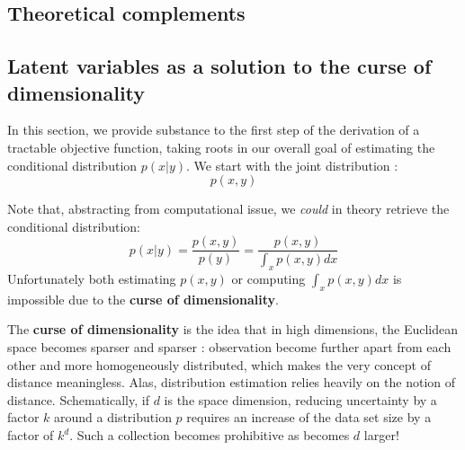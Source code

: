 \documentclass{article}
\begin{document}
\printbibliography[
    heading = subbibintoc,
    type=article,
    title={Scientific papers}]
    
\printbibliography[
    heading = subbibintoc,
    type=online,
    title={Online resources}]
    
\pagebreak



{}
\begin{appendix}

\section{Theoretical complements}

\begin{multicols}{2}

\subsection{Latent variables as a solution to the curse of dimensionality} \label{app:latent}

In this section, we provide substance to the first step of the derivation of a tractable objective function, taking roots in our overall goal of estimating the conditional distribution $p(x|y)$.  We start with the joint distribution %
: $$p(x,y)$$

Note that, abstracting from computational issue, we \textit{could} in theory retrieve the conditional distribution: $$p(x|y)=\frac{p(x,y)}{p(y)}=\frac{p(x,y)}{\int_x p(x,y)dx} $$
Unfortunately both estimating $p(x,y)$ or computing $\int_x p(x,y)dx$ is impossible due to the \textbf{curse of dimensionality}.

The \textbf{curse of dimensionality} is the idea that in high dimensions, the Euclidean space becomes sparser and sparser : observation become further apart from each other and more homogeneously distributed, which makes the very concept of distance meaningless. Alas, distribution estimation relies heavily on the notion of distance. Schematically, if $d$ is the space dimension, reducing uncertainty by a factor $k$ around a distribution $p$ requires an increase of the data set size by a factor of $k^d$. Such a collection becomes prohibitive as becomes $d$ larger!


\end{multicols}
\end{appendix}
\end{document}
